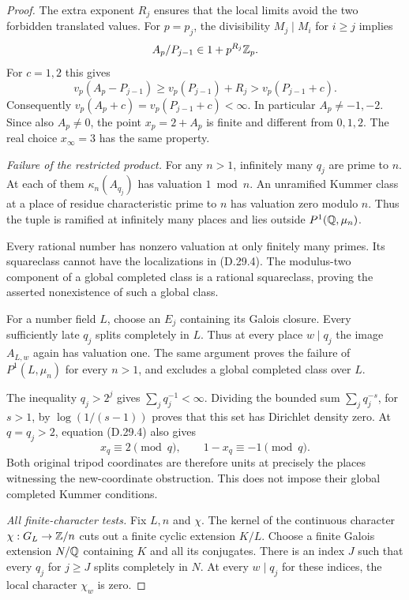 \begin{proof}
The extra exponent $R_j$ ensures that the local limits
avoid the two forbidden translated values. For $p=p_j$,
the divisibility $M_j\mid M_i$ for $i\ge j$ implies
\[
              A_p/P_{j-1}\in1+p^{R_j}\mathbb Z_p.
\]
For $c=1,2$ this gives
\[
 v_p(A_p-P_{j-1})\ge v_p(P_{j-1})+R_j
                         >v_p(P_{j-1}+c).
\]
Consequently
$v_p(A_p+c)=v_p(P_{j-1}+c)<\infty$.
In particular $A_p\ne-1,-2$. Since also $A_p\ne0$,
the point $x_p=2+A_p$ is finite and different from $0,1,2$.
The real choice $x_\infty=3$ has the same property.

\emph{Failure of the restricted product.}
For any $n>1$, infinitely many $q_j$ are prime to $n$.
At each of them $\kappa_n(A_{q_j})$ has valuation
$1\bmod n$. An unramified Kummer class at a place of
residue characteristic prime to $n$ has valuation zero
modulo $n$. Thus the tuple is ramified at infinitely many
places and lies outside $P^1(\mathbb Q,\mu_n)$.

Every rational number has nonzero valuation at only
finitely many primes. Its squareclass cannot have the
localizations in (D.29.4). The modulus-two component of a
global completed class is a rational squareclass, proving
the asserted nonexistence of such a global class.

For a number field $L$, choose an $E_j$ containing its
Galois closure. Every sufficiently late $q_j$ splits
completely in $L$. Thus at every place $w\mid q_j$ the
image $A_{L,w}$ again has valuation one. The same argument
proves the failure of $P^1(L,\mu_n)$ for every $n>1$, and
excludes a global completed class over $L$.

The inequality $q_j>2^j$ gives
$\sum_jq_j^{-1}<\infty$. Dividing the bounded sum
$\sum_jq_j^{-s}$, for $s>1$, by
$\log(1/(s-1))$ proves that this set has Dirichlet density
zero. At $q=q_j>2$, equation (D.29.4) also gives
\[
              x_q\equiv2\pmod q,
              \qquad 1-x_q\equiv-1\pmod q.
\]
Both original tripod coordinates are therefore units at
precisely the places witnessing the new-coordinate
obstruction. This does not impose their global completed
Kummer conditions.

\emph{All finite-character tests.}
Fix $L,n$ and $\chi$. The kernel of the continuous
character $\chi:G_L\to\mathbb Z/n$ cuts out a finite cyclic
extension $K/L$. Choose a finite Galois extension
$N/\mathbb Q$ containing $K$ and all its conjugates. There is an
index $J$ such that every $q_j$ for $j\ge J$ splits
completely in $N$. At every $w\mid q_j$ for these indices,
the local character $\chi_w$ is zero.


\end{proof}

